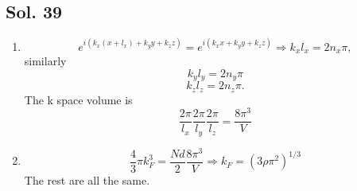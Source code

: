    \subsection*{Sol. 39}
   \begin{enumerate}
       \item 
       $$
       e^{i(k_x(x+l_x)+k_y y + k_zz)}
       =e^{i(k_xx+k_yy+k_zz)}
       \Rightarrow k_xl_x=2n_x\pi,
       $$
       similarly 
       $$
       k_yl_y = 2n_y\pi
       $$
       $$
       k_zl_z = 2n_z\pi.
       $$
       The k space volume is 
       $$
       \frac{2\pi}{l_x}
       \frac{2\pi}{l_y}
       \frac{2\pi}{l_z} = \frac{8\pi^3}{V}
       $$
       \item 
       $$
       \frac{4}{3}\pi k_F^3 = \frac{Nd}{2}\frac{8\pi^3}{V}
       \Rightarrow k_F = 
       (3\rho\pi^2)^{1/3}
       $$
       The rest are all the same. 
       
   \end{enumerate}